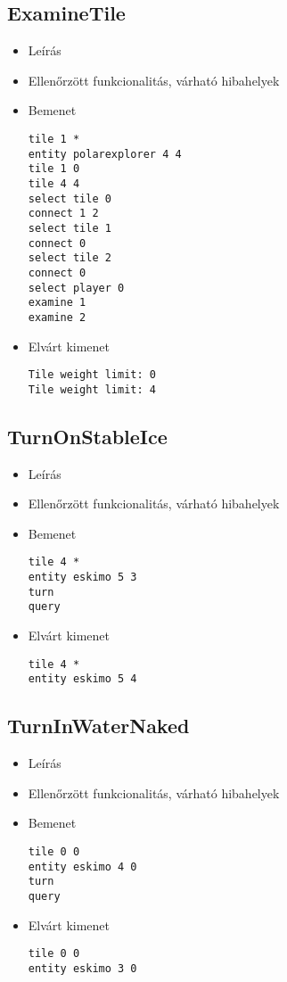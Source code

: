 \subsection{ExamineTile}
\begin{itemize}
\item Leírás\newline
\item Ellenőrzött funkcionalitás, várható hibahelyek
\item Bemenet
\begin{lstlisting}
tile 1 *
entity polarexplorer 4 4
tile 1 0
tile 4 4
select tile 0
connect 1 2
select tile 1
connect 0
select tile 2
connect 0
select player 0
examine 1
examine 2
\end{lstlisting}
\item Elvárt kimenet
\begin{lstlisting}
Tile weight limit: 0
Tile weight limit: 4
\end{lstlisting}
\end{itemize}

\subsection{TurnOnStableIce}
\begin{itemize}
\item Leírás\newline
\item Ellenőrzött funkcionalitás, várható hibahelyek
\item Bemenet
\begin{lstlisting}
tile 4 *
entity eskimo 5 3
turn
query
\end{lstlisting}
\item Elvárt kimenet
\begin{lstlisting}
tile 4 *
entity eskimo 5 4
\end{lstlisting}
\end{itemize}

\subsection{TurnInWaterNaked}
\begin{itemize}
\item Leírás\newline
\item Ellenőrzött funkcionalitás, várható hibahelyek
\item Bemenet
\begin{lstlisting}
tile 0 0
entity eskimo 4 0
turn
query
\end{lstlisting}
\item Elvárt kimenet
\begin{lstlisting}
tile 0 0
entity eskimo 3 0
\end{lstlisting}
\end{itemize}

